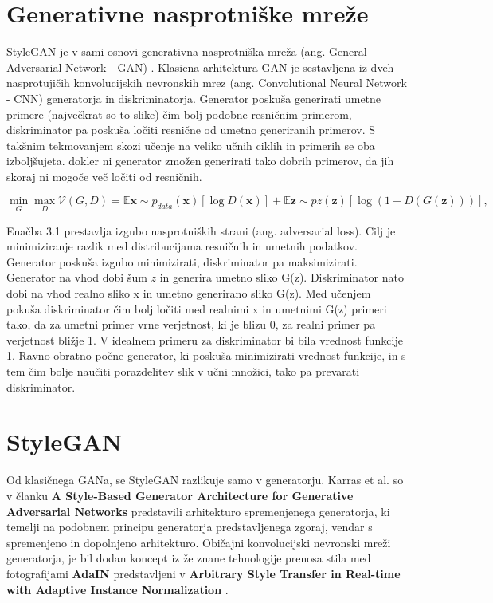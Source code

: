 \documentclass[a4paper,12pt,openright]{book}
\begin{document}
\section{Generativne nasprotniške mreže}
StyleGAN je v sami osnovi generativna nasprotniška mreža (ang. General Adversarial Network - GAN) \cite{goodfellow2014generative}. Klasicna arhitektura GAN je sestavljena iz dveh nasprotujičih konvolucijskih nevronskih mrez (ang. Convolutional Neural Network - CNN) \cite{} generatorja in diskriminatorja. Generator poskuša generirati umetne primere (največkrat so to slike) čim bolj podobne resničnim primerom, diskriminator pa poskuša ločiti resnične od umetno generiranih primerov. S takšnim tekmovanjem skozi učenje na veliko učnih ciklih in primerih se oba izboljšujeta. dokler ni generator zmožen generirati tako dobrih primerov, da jih skoraj ni mogoče več ločiti od resničnih.

\begin{equation}
\min_{G}\max_{D} \mathcal{V}(G, D) = \mathbb{E}{\boldsymbol{x} \sim p_{data}(\boldsymbol{x})} [\log D(\boldsymbol{x})] + \mathbb{E}{\boldsymbol{z} \sim p{z}(\boldsymbol{z})} [\log (1 - D(G(\boldsymbol{z})))],
\end{equation}

Enačba 3.1 prestavlja izgubo nasprotniških strani (ang. adversarial loss). Cilj je minimiziranje razlik med distribucijama resničnih in umetnih podatkov. Generator poskuša izgubo minimizirati, diskriminator pa maksimizirati. 
Generator na vhod dobi šum $z$ in generira umetno sliko G(z). Diskriminator nato dobi na vhod realno sliko x in umetno generirano sliko G(z). Med učenjem pokuša diskriminator čim bolj ločiti med realnimi x in umetnimi G(z) primeri tako, da za umetni primer vrne verjetnost, ki je blizu 0, za realni primer pa verjetnost bližje 1. V idealnem primeru za diskriminator bi bila vrednost funkcije 1. Ravno obratno počne generator, ki poskuša minimizirati vrednost funkcije, in s tem čim bolje naučiti porazdelitev slik v učni množici, tako pa prevarati diskriminator.


\section{StyleGAN}
Od klasičnega GANa, se StyleGAN razlikuje samo v generatorju. Karras et al. so v članku \textbf{A Style-Based Generator Architecture for Generative Adversarial Networks} \cite{karras2019style} predstavili arhitekturo spremenjenega generatorja, ki temelji na podobnem principu generatorja predstavljenega zgoraj, vendar s spremenjeno in dopolnjeno arhitekturo. Običajni konvolucijski nevronski mreži generatorja, je bil dodan koncept iz že znane tehnologije prenosa stila med fotografijami \textbf{AdaIN} predstavljeni v \textbf{Arbitrary Style Transfer in Real-time with Adaptive Instance Normalization} \cite{huang2017adain}. 
\end{document}
